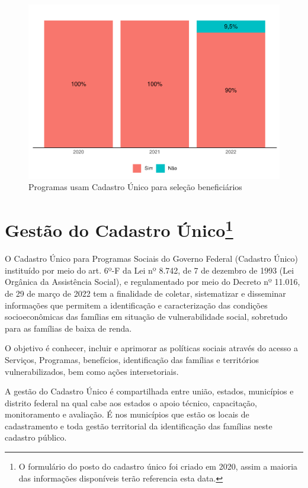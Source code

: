 \documentclass[
  brazilian]{report}
\begin{document}
\begin{figure}
\includegraphics{Censo-SUAS-2022_files/figure-latex/uf_usa_cad-1} \caption[Programas usam Cadastro Único para seleção beneficiários]{Programas usam Cadastro Único para seleção beneficiários}\label{fig:uf_usa_cad}
\end{figure}

\section[Gestão do Cadastro Único]{Gestão do Cadastro Único\footnote{O formulário do posto do cadastro único foi criado em 2020, assim a maioria das informações disponíveis terão referencia esta data.}}

O Cadastro Único para Programas Sociais do Governo Federal (Cadastro
Único) instituído por meio do art. 6º-F da Lei nº 8.742, de 7 de
dezembro de 1993 (Lei Orgânica da Assistência Social), e regulamentado
por meio do Decreto nº 11.016, de 29 de março de 2022 tem a finalidade
de coletar, sistematizar e disseminar informações que permitem a
identificação e caracterização das condições socioeconômicas das
famílias em situação de vulnerabilidade social, sobretudo para as
famílias de baixa de renda.

O objetivo é conhecer, incluir e aprimorar as políticas sociais através
do acesso a Serviços, Programas, benefícios, identificação das famílias
e territórios vulnerabilizados, bem como ações intersetoriais.

A gestão do Cadastro Único é compartilhada entre união, estados,
municípios e distrito federal na qual cabe aos estados o apoio técnico,
capacitação, monitoramento e avaliação. É nos municípios que estão os
locais de cadastramento e toda gestão territorial da identificação das
famílias neste cadastro público.
\end{document}
